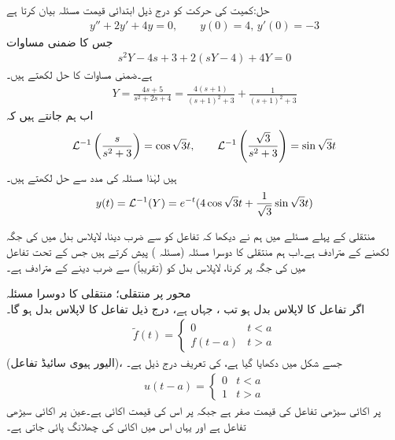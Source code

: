 حل:کمیت کی حرکت کو درج ذیل ابتدائی قیمت مسئلہ بیان کرتا ہے
\begin{align*}
y''+2y'+4y=0,\quad \quad y(0)=4, \, y'(0)=-3
\end{align*}
جس کا ضمنی مساوات 
\begin{align*}
s^2Y-4s+3+2(sY-4)+4Y=0
\end{align*}
ہے۔ضمنی مساوات کا حل لکھتے ہیں۔
\begin{align*}
Y=\frac{4s+5}{s^2+2s+4}=\frac{4(s+1)}{(s+1)^2+3}+\frac{1}{(s+1)^2+3}
\end{align*}
اب ہم جانتے ہیں کہ
\begin{align*}
\mathcal{L}^{-1}\left(\frac{s}{s^2+3}\right)=\cos \sqrt{3}t, \quad \quad \mathcal{L}^{-1}\left(\frac{\sqrt{3}}{s^2+3}\right)=\sin \sqrt{3}t
\end{align*}
ہیں لہٰذا مسئلہ  کی مدد سے حل لکھتے ہیں۔
\begin{align*}
y(t)=\mathcal{L}^{-1}(Y)=e^{-t}(4\cos \sqrt{3}t+\frac{1}{\sqrt{3}}\sin \sqrt{3}t)
\end{align*}

منتقلی کے پہلے مسئلے میں ہم نے دیکھا کہ تفاعل  کو  سے ضرب دینا، لاپلاس بدل میں  کی جگہ  لکھنے کے مترادف ہے۔اب ہم منتقلی کا دوسرا مسئلہ (مسئلہ ) پیش کرتے ہیں جس کے تحت تفاعل  میں  کی جگہ  پر کرنا، لاپلاس بدل  کو (تقریباً)  سے ضرب دینے کے مترادف ہے۔

\quad {} محور پر منتقلی؛ منتقلی کا دوسرا مسئلہ\\
اگر تفاعل  کا لاپلاس بدل  ہو تب ، جہاں  ہے، درج ذیل تفاعل کا لاپلاس بدل ہو گا۔
\begin{align*}
\tilde{f}(t)=
\begin{cases}
0& t<a\\
f(t-a) &  t>a
\end{cases}
\end{align*}
 (الیور ہیوی سائیڈ تفاعل)، جسے شکل  میں دکھایا گیا ہے، کی تعریف درج ذیل ہے۔
\begin{align}
u(t-a)=
\begin{cases}
0 & t<a\\
1& t>a
\end{cases}
\end{align}
 پر اکائی سیڑھی تفاعل کی قیمت صفر ہے جبکہ  پر اس کی قیمت اکائی ہے۔عین  پر اکائی سیڑھی تفاعل  ہے اور یہاں اس میں اکائی کی چھلانگ پائی جاتی ہے۔

